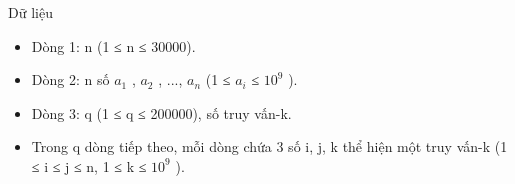 Dữ liệu
\begin{itemize}
	\item     Dòng 1: n (1 ≤ n ≤ 30000).   
	\item     Dòng 2: n số $a_{1}$    , $a_{2}$    , ...,   $a_{n}$    (1 ≤ $a_{i}$    ≤   $10^{9}$    ).   
	\item     Dòng 3: q (1 ≤ q ≤ 200000), số truy vấn-k.   
	\item     Trong q dòng tiếp theo, mỗi dòng chứa 3 số i, j, k   thể hiện một truy vấn-k (1 ≤ i ≤ j ≤ n, 1 ≤ k ≤   $10^{9}$    ).   
\end{itemize}
